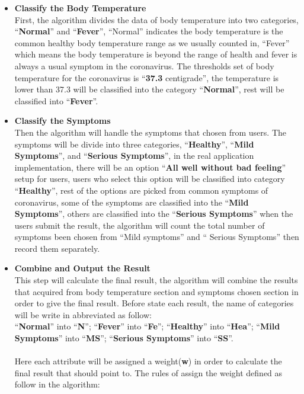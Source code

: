 \documentclass[12pt]{article}
\begin{document}
\begin{itemize}
\item\textbf{Classify the Body Temperature}
\\First, the algorithm divides the data of body temperature into two categories, ``\textbf{Normal}'' and ``\textbf{Fever}'', ``Normal'' indicates the body temperature is the common healthy body temperature range as we usually counted in, ``Fever'' which means the body temperature is beyond the range of health and fever is always a usual symptom in the coronavirus. The thresholds set of body temperature for the coronavirus is ``\textbf{37.3 }centigrade'', the temperature is lower than 37.3 will be classified into the category ``\textbf{Normal}'', rest will be classified into ``\textbf{Fever}''.
\item\textbf{Classify the Symptoms}
\\Then the algorithm will handle the symptoms that chosen from users. The symptoms will be divide into three categories, ``\textbf{Healthy}'', ``\textbf{Mild Symptoms}'', and ``\textbf{Serious Symptoms}'', in the real application implementation, there will be an option ``\textbf{All well without bad feeling}'' setup for users, users who select this option will be classified into category ``\textbf{Healthy}'', rest of the options are picked from common symptoms of coronavirus, some of the symptoms are classified into the ``\textbf{Mild Symptoms}'', others are classified into the ``\textbf{Serious Symptoms}'' when the users submit the result, the algorithm will count the total number of symptoms been chosen from ``Mild symptoms'' and `` Serious Symptoms'' then record them separately.
\item\textbf{Combine and Output the Result}
\\This step will calculate the final result, the algorithm will combine the results that acquired from body temperature section and symptoms chosen section in order to give the final result. Before state each result, the name of categories will be write in abbreviated as follow:
\\ ``\textbf{Normal}'' into ``\textbf{N}''; ``\textbf{Fever}'' into ``\textbf{Fe}''; ``\textbf{Healthy}'' into ``\textbf{Hea}''; ``\textbf{Mild Symptoms}'' into ``\textbf{MS}''; ``\textbf{Serious Symptoms}'' into ``\textbf{SS}''.
\\
\\Here each attribute will be assigned a weight(\textbf{w}) in order to calculate the final result that should point to. The rules of assign the weight defined as follow in the algorithm:

\end{itemize}
\end{document}
